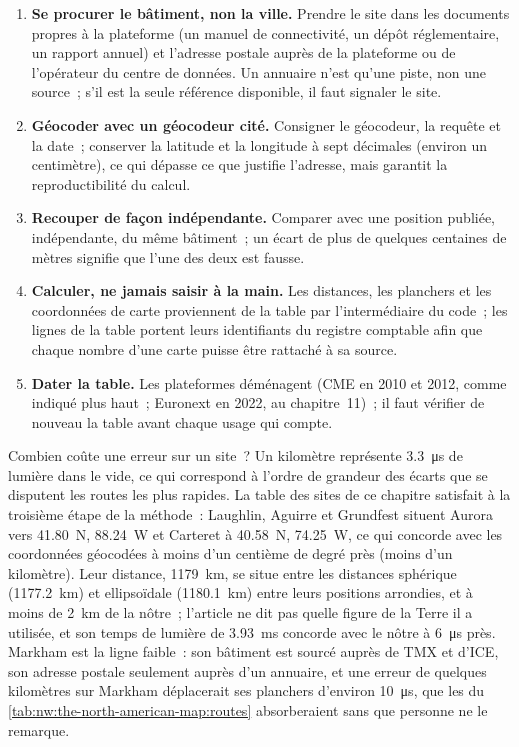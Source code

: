 \begin{method}\label{met:nw:the-north-american-map:table}
\begin{enumerate}
\item \textbf{Se procurer le bâtiment, non la ville.} Prendre le site dans les documents propres à la plateforme (un manuel de connectivité, un dépôt réglementaire, un rapport annuel)
  et l'adresse postale auprès de la plateforme ou de l'opérateur du centre de données. Un annuaire n'est qu'une piste, non une source~; s'il est la seule référence disponible, il faut signaler le site.
\item \textbf{Géocoder avec un géocodeur cité.} Consigner le géocodeur, la requête et la date~; conserver la latitude et la longitude à sept décimales
  (environ un centimètre), ce qui dépasse ce que justifie l'adresse, mais garantit la reproductibilité du calcul.
\item \textbf{Recouper de façon indépendante.} Comparer avec une position publiée, indépendante, du même bâtiment~; un écart de plus de quelques
  centaines de mètres signifie que l'une des deux est fausse.
\item \textbf{Calculer, ne jamais saisir à la main.} Les distances, les planchers et les coordonnées de carte proviennent de la table par l'intermédiaire du code~; les lignes de la table portent leurs identifiants du registre comptable
  afin que chaque nombre d'une carte puisse être rattaché à sa source.
\item \textbf{Dater la table.} Les plateformes déménagent (CME en 2010 et 2012, comme indiqué plus haut~; Euronext en 2022, au chapitre~11)~; il faut vérifier de nouveau la table avant
  chaque usage qui compte.
\end{enumerate}
\end{method}

Combien coûte une erreur sur un site~? Un kilomètre représente \qty{3.3}{\micro\second} de lumière dans le vide, ce qui correspond à l'ordre de grandeur des écarts que se disputent les
routes les plus rapides. La table des sites de ce chapitre satisfait à la troisième étape de la méthode~: Laughlin, Aguirre et Grundfest situent Aurora vers
41.80\textdegree{}~N, 88.24\textdegree{}~W et Carteret à 40.58\textdegree{}~N, 74.25\textdegree{}~W, ce qui concorde avec les coordonnées géocodées à moins
d'un centième de degré près (moins d'un kilomètre). Leur distance, \qty{1179}{\kilo\metre}, se situe entre les distances sphérique (\qty{1177.2}{\kilo\metre}) et ellipsoïdale
(\qty{1180.1}{\kilo\metre}) entre leurs positions arrondies, et à moins de \qty{2}{\kilo\metre} de la nôtre~; l'article ne dit pas quelle figure de la
Terre il a utilisée, et son temps de lumière de \qty{3.93}{\milli\second} concorde avec le nôtre à \qty{6}{\micro\second} près. Markham est la ligne faible~: son
bâtiment est sourcé auprès de TMX et d'ICE, son adresse postale seulement auprès d'un annuaire, et une erreur de quelques kilomètres sur Markham déplacerait ses planchers
d'environ \qty{10}{\micro\second}, que les  du \cref{tab:nw:the-north-american-map:routes} absorberaient sans que personne ne le remarque.

